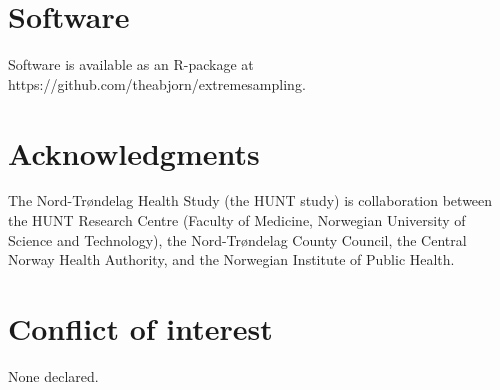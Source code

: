 \documentclass[10pt,a4paper]{article}
\begin{document}
\section*{Software}
Software is available as an R-package at https://github.com/theabjorn/extremesampling.

\section*{Acknowledgments}
The Nord-Trøndelag Health Study (the HUNT study) is collaboration between the HUNT Research Centre (Faculty of Medicine, Norwegian University of Science and Technology), the Nord-Trøndelag County Council, the Central Norway Health Authority, and the Norwegian Institute of Public Health.

\section*{Conflict of interest}
None declared.

\newpage

\appendix
\allowdisplaybreaks
\end{document}
